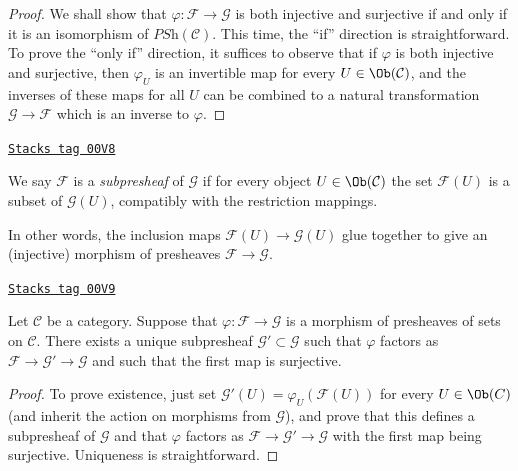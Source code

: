 \begin{proof}
\medskip\noindent
We shall show that $\varphi : \mathcal{F} \to
\mathcal{G}$ is both injective and surjective if and only if it
is an isomorphism of $\textit{PSh}(\mathcal{C})$. This time,
the ``if'' direction is straightforward. To prove the ``only if''
direction, it suffices to observe that if $\varphi$ is both
injective and surjective, then $\varphi_U$ is an invertible map
for every $U \in \Ob(\mathcal{C})$, and the inverses of these
maps for all $U$ can be combined to a natural transformation
$\mathcal{G} \to \mathcal{F}$ which is an inverse to $\varphi$.
\end{proof}

\begin{definition}
\label{sites-definition-sub-presheaf}
\href{https://stacks.math.columbia.edu/tag/00V8}{\texttt{Stacks tag 00V8}}

We say $\mathcal{F}$ is a {\it subpresheaf} of $\mathcal{G}$
if for every object $U \in \Ob(\mathcal{C})$ the set
$\mathcal{F}(U)$ is a subset of $\mathcal{G}(U)$, compatibly
with the restriction mappings.
\end{definition}

In other words, the inclusion
maps $\mathcal{F}(U) \to \mathcal{G}(U)$
glue together to give an (injective) morphism of
presheaves $\mathcal{F} \to \mathcal{G}$.

\begin{lemma}[Image]
\label{sites-lemma-image}
\href{https://stacks.math.columbia.edu/tag/00V9}{\texttt{Stacks tag 00V9}}

Let $\mathcal{C}$ be a category.
Suppose that $\varphi : \mathcal{F} \to \mathcal{G}$ is a
morphism of presheaves of sets on $\mathcal{C}$.
There exists a unique subpresheaf $\mathcal{G}' \subset \mathcal{G}$
such that $\varphi$ factors as
$\mathcal{F} \to \mathcal{G}' \to \mathcal{G}$
and such that the first map is surjective.
\end{lemma}

\begin{proof}
To prove existence, just set
$\mathcal{G}'(U) = \varphi_U \left(\mathcal{F}(U)\right)$
for every $U \in \Ob(C)$ (and inherit the action on morphisms
from $\mathcal{G}$), and prove that this defines a
subpresheaf of $\mathcal{G}$ and that $\varphi$ factors as
$\mathcal{F} \to \mathcal{G}' \to \mathcal{G}$ with the
first map being surjective. Uniqueness is straightforward.
\end{proof}

